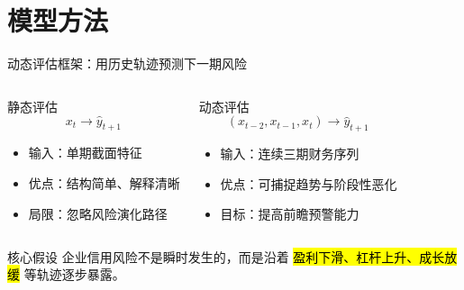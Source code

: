 \section{模型方法}

\begin{frame}{动态评估框架：用历史轨迹预测下一期风险}
  \begin{columns}[T,onlytextwidth]
    \begin{block}{静态评估}
      \[
      x_t \rightarrow \hat{y}_{t+1}
      \]
      \begin{itemize}
        \item 输入：单期截面特征
        \item 优点：结构简单、解释清晰
        \item 局限：忽略风险演化路径
      \end{itemize}
    \end{block}

    \begin{exampleblock}{动态评估}
      \[
      (x_{t-2},x_{t-1},x_t) \rightarrow \hat{y}_{t+1}
      \]
      \begin{itemize}
        \item 输入：连续三期财务序列
        \item 优点：可捕捉趋势与阶段性恶化
        \item 目标：提高前瞻预警能力
      \end{itemize}
    \end{exampleblock}
  \end{columns}

  \begin{alertblock}{核心假设}
    企业信用风险不是瞬时发生的，而是沿着 \hl{盈利下滑、杠杆上升、成长放缓} 等轨迹逐步暴露。
  \end{alertblock}
\end{frame}

